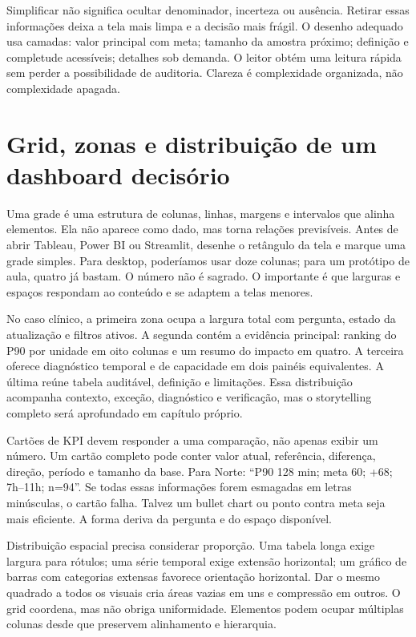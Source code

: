 Simplificar não significa ocultar denominador, incerteza ou ausência. Retirar essas informações deixa a tela mais limpa e a decisão mais frágil. O desenho adequado usa camadas: valor principal com meta; tamanho da amostra próximo; definição e completude acessíveis; detalhes sob demanda. O leitor obtém uma leitura rápida sem perder a possibilidade de auditoria. Clareza é complexidade organizada, não complexidade apagada.

\section{Grid, zonas e distribuição de um dashboard decisório}

Uma grade é uma estrutura de colunas, linhas, margens e intervalos que alinha elementos. Ela não aparece como dado, mas torna relações previsíveis. Antes de abrir Tableau, Power BI ou Streamlit, desenhe o retângulo da tela e marque uma grade simples. Para desktop, poderíamos usar doze colunas; para um protótipo de aula, quatro já bastam. O número não é sagrado. O importante é que larguras e espaços respondam ao conteúdo e se adaptem a telas menores.

No caso clínico, a primeira zona ocupa a largura total com pergunta, estado da atualização e filtros ativos. A segunda contém a evidência principal: ranking do P90 por unidade em oito colunas e um resumo do impacto em quatro. A terceira oferece diagnóstico temporal e de capacidade em dois painéis equivalentes. A última reúne tabela auditável, definição e limitações. Essa distribuição acompanha contexto, exceção, diagnóstico e verificação, mas o storytelling completo será aprofundado em capítulo próprio.

Cartões de KPI devem responder a uma comparação, não apenas exibir um número. Um cartão completo pode conter valor atual, referência, diferença, direção, período e tamanho da base. Para Norte: ``P90 128 min; meta 60; +68; 7h--11h; n=94''. Se todas essas informações forem esmagadas em letras minúsculas, o cartão falha. Talvez um bullet chart ou ponto contra meta seja mais eficiente. A forma deriva da pergunta e do espaço disponível.

Distribuição espacial precisa considerar proporção. Uma tabela longa exige largura para rótulos; uma série temporal exige extensão horizontal; um gráfico de barras com categorias extensas favorece orientação horizontal. Dar o mesmo quadrado a todos os visuais cria áreas vazias em uns e compressão em outros. O grid coordena, mas não obriga uniformidade. Elementos podem ocupar múltiplas colunas desde que preservem alinhamento e hierarquia.

